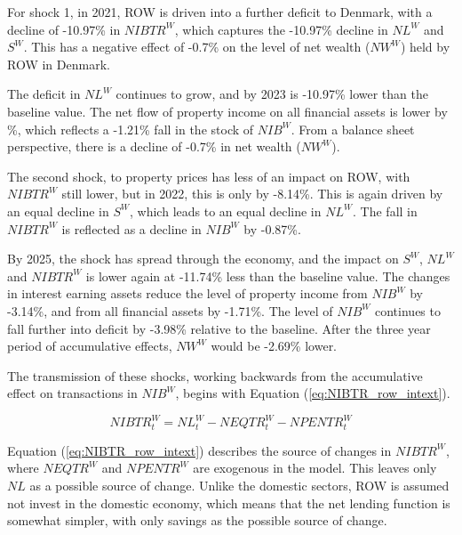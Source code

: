 \documentclass[
]{book}
\begin{document}
For shock 1, in 2021, ROW is driven into a further deficit to Denmark, with a decline of -10.97\% in \(NIBTR^W\), which captures the -10.97\% decline in \(NL^W\) and \(S^W\). This has a negative effect of -0.7\% on the level of net wealth (\(NW^W\)) held by ROW in Denmark.

The deficit in \(NL^W\) continues to grow, and by 2023 is -10.97\% lower than the baseline value. The net flow of property income on all financial assets is lower by \%, which reflects a -1.21\% fall in the stock of \(NIB^W\). From a balance sheet perspective, there is a decline of -0.7\% in net wealth (\(NW^W\)).

The second shock, to property prices has less of an impact on ROW, with \(NIBTR^W\) still lower, but in 2022, this is only by -8.14\%. This is again driven by an equal decline in \(S^W\), which leads to an equal decline in \(NL^W\). The fall in \(NIBTR^W\) is reflected as a decline in \(NIB^W\) by -0.87\%.

By 2025, the shock has spread through the economy, and the impact on \(S^W\), \(NL^W\) and \(NIBTR^W\) is lower again at -11.74\% less than the baseline value. The changes in interest earning assets reduce the level of property income from \(NIB^W\) by -3.14\%, and from all financial assets by -1.71\%. The level of \(NIB^W\) continues to fall further into deficit by -3.98\% relative to the baseline. After the three year period of accumulative effects, \(NW^W\) would be -2.69\% lower.

The transmission of these shocks, working backwards from the accumulative effect on transactions in \(NIB^W\), begins with Equation (\ref{eq:NIBTR_row_intext}).

\begin{equation}
NIBTR^W_t = NL^W_t - NEQTR^W_t - NPENTR^W_t
\label{eq:NIBTR_row_intext}
\end{equation}

Equation (\ref{eq:NIBTR_row_intext}) describes the source of changes in \(NIBTR^W\), where \(NEQTR^W\) and \(NPENTR^W\) are exogenous in the model. This leaves only \(NL\) as a possible source of change. Unlike the domestic sectors, ROW is assumed not invest in the domestic economy, which means that the net lending function is somewhat simpler, with only savings as the possible source of change.
\end{document}
